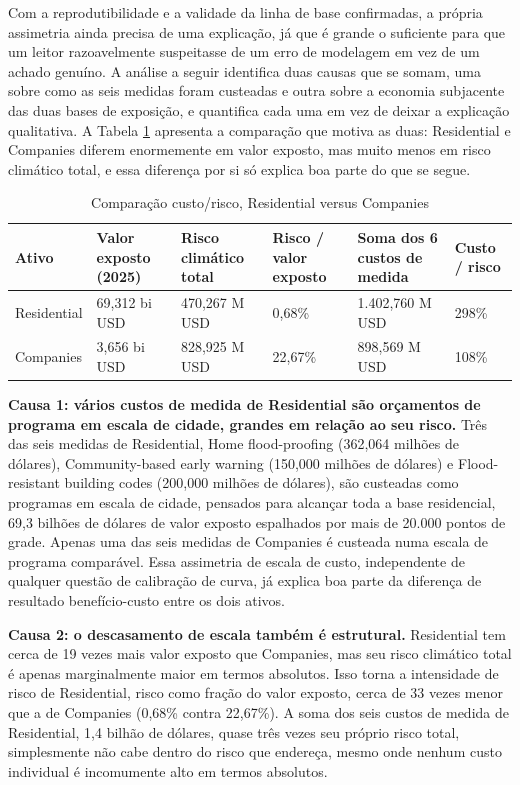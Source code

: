 \documentclass[11pt]{article}
\begin{document}
Com a reprodutibilidade e a validade da linha de base confirmadas, a própria assimetria
ainda precisa de uma explicação, já que é grande o suficiente para que um leitor
razoavelmente suspeitasse de um erro de modelagem em vez de um achado genuíno. A análise a
seguir identifica duas causas que se somam, uma sobre como as seis medidas foram custeadas
e outra sobre a economia subjacente das duas bases de exposição, e quantifica cada uma em
vez de deixar a explicação qualitativa. A Tabela \ref{tab:causaraiz} apresenta a
comparação que motiva as duas: Residential e Companies diferem enormemente em valor
exposto, mas muito menos em risco climático total, e essa diferença por si só explica boa
parte do que se segue.

\begin{table}[H]
\centering
\caption{Comparação custo/risco, Residential versus Companies}
\label{tab:causaraiz}
\small
\begin{tabular}{lp{2.1cm}p{2.1cm}p{2.1cm}p{2.3cm}p{1.5cm}}
\toprule
Ativo & Valor exposto (2025) & Risco climático total & Risco / valor exposto & Soma dos 6 custos de medida & Custo / risco \\
\midrule
Residential & 69,312 bi USD & 470,267 M USD & 0,68\% & 1.402,760 M USD & 298\% \\
Companies & 3,656 bi USD & 828,925 M USD & 22,67\% & 898,569 M USD & 108\% \\
\bottomrule
\end{tabular}
\end{table}

\textbf{Causa 1: vários custos de medida de Residential são orçamentos de programa em
escala de cidade, grandes em relação ao seu risco.} Três das seis medidas de Residential,
Home flood-proofing (362,064 milhões de dólares), Community-based early warning (150,000
milhões de dólares) e Flood-resistant building codes (200,000 milhões de dólares), são
custeadas como programas em escala de cidade, pensados para alcançar toda a base
residencial, 69,3 bilhões de dólares de valor exposto espalhados por mais de 20.000 pontos
de grade. Apenas uma das seis medidas de Companies é custeada numa escala de programa
comparável. Essa assimetria de escala de custo, independente de qualquer questão de
calibração de curva, já explica boa parte da diferença de resultado benefício-custo entre
os dois ativos.

\textbf{Causa 2: o descasamento de escala também é estrutural.} Residential tem cerca de 19
vezes mais valor exposto que Companies, mas seu risco climático total é apenas
marginalmente maior em termos absolutos. Isso torna a intensidade de risco de Residential,
risco como fração do valor exposto, cerca de 33 vezes menor que a de Companies (0,68\%
contra 22,67\%). A soma dos seis custos de medida de Residential, 1,4 bilhão de dólares,
quase três vezes seu próprio risco total, simplesmente não cabe dentro do risco que
endereça, mesmo onde nenhum custo individual é incomumente alto em termos absolutos.
\end{document}
